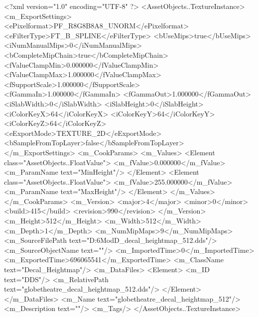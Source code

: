 <?xml version="1.0" encoding="UTF-8" ?>
<AssetObjects..TextureInstance>
	<m_ExportSettings>
		<ePixelformat>PF_R8G8B8A8_UNORM</ePixelformat>
		<eFilterType>FT_B_SPLINE</eFilterType>
		<bUseMips>true</bUseMips>
		<iNumManualMips>0</iNumManualMips>
		<bCompleteMipChain>true</bCompleteMipChain>
		<fValueClampMin>0.000000</fValueClampMin>
		<fValueClampMax>1.000000</fValueClampMax>
		<fSupportScale>1.000000</fSupportScale>
		<fGammaIn>1.000000</fGammaIn>
		<fGammaOut>1.000000</fGammaOut>
		<iSlabWidth>0</iSlabWidth>
		<iSlabHeight>0</iSlabHeight>
		<iColorKeyX>64</iColorKeyX>
		<iColorKeyY>64</iColorKeyY>
		<iColorKeyZ>64</iColorKeyZ>
		<eExportMode>TEXTURE_2D</eExportMode>
		<bSampleFromTopLayer>false</bSampleFromTopLayer>
	</m_ExportSettings>
	<m_CookParams>
		<m_Values>
			<Element class="AssetObjects..FloatValue">
				<m_fValue>0.000000</m_fValue>
				<m_ParamName text="MinHeight"/>
			</Element>
			<Element class="AssetObjects..FloatValue">
				<m_fValue>255.000000</m_fValue>
				<m_ParamName text="MaxHeight"/>
			</Element>
		</m_Values>
	</m_CookParams>
	<m_Version>
		<major>4</major>
		<minor>0</minor>
		<build>415</build>
		<revision>990</revision>
	</m_Version>
	<m_Height>512</m_Height>
	<m_Width>512</m_Width>
	<m_Depth>1</m_Depth>
	<m_NumMipMaps>9</m_NumMipMaps>
	<m_SourceFilePath text="D:\Civ6Mod\3D\Wonders\Globe\globetheatre_decal_heightmap_512.dds"/>
	<m_SourceObjectName text=""/>
	<m_ImportedTime>0</m_ImportedTime>
	<m_ExportedTime>696065541</m_ExportedTime>
	<m_ClassName text="Decal_Heightmap"/>
	<m_DataFiles>
		<Element>
			<m_ID text="DDS"/>
			<m_RelativePath text="globetheatre_decal_heightmap_512.dds"/>
		</Element>
	</m_DataFiles>
	<m_Name text="globetheatre_decal_heightmap_512"/>
	<m_Description text=""/>
	<m_Tags/>
</AssetObjects..TextureInstance>

